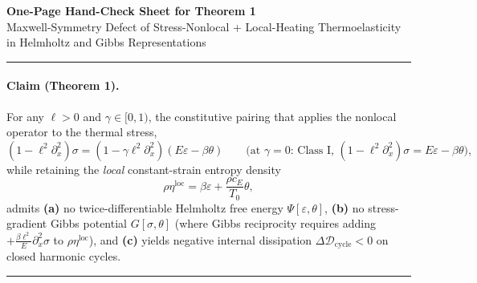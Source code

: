 \documentclass[10pt,a4paper]{article}
\begin{document}
\begin{center}
  {\Large\bfseries One-Page Hand-Check Sheet for Theorem 1}\\[4pt]
  {\small Maxwell-Symmetry Defect of Stress-Nonlocal + Local-Heating Thermoelasticity in Helmholtz and Gibbs Representations}
\end{center}
\vspace{-4pt}
\noindent\rule{\textwidth}{0.6pt}

\paragraph{Claim (Theorem 1).}
For any $\ell > 0$ and $\gamma \in [0,1)$, the constitutive pairing that applies the nonlocal operator to the thermal stress,
\begin{equation}
  (1 - \ell^2\partial_x^2)\sigma = (1 - \gamma\ell^2\partial_x^2)(E\varepsilon - \beta\theta) \qquad \big(\text{at }\gamma = 0\text{: Class I, }(1-\ell^2\partial_x^2)\sigma = E\varepsilon - \beta\theta\big),\label{eq:1}
\end{equation}
while retaining the \emph{local} constant-strain entropy density
\begin{equation}
  \rho\eta^{\mathrm{loc}} = \beta\varepsilon + \frac{\rho c_E}{T_0}\theta,\label{eq:2}
\end{equation}
admits \textbf{(a)} no twice-differentiable Helmholtz free energy $\Psi[\varepsilon,\theta]$, \textbf{(b)} no stress-gradient Gibbs potential $G[\sigma,\theta]$ (where Gibbs reciprocity requires adding $+\frac{\beta\ell^2}{E}\partial_x^2\sigma$ to $\rho\eta^{\mathrm{loc}}$), and \textbf{(c)} yields negative internal dissipation $\Delta\mathcal{D}_{\mathrm{cycle}} < 0$ on closed harmonic cycles.

\smallskip\noindent\rule{\textwidth}{0.4pt}
\end{document}
